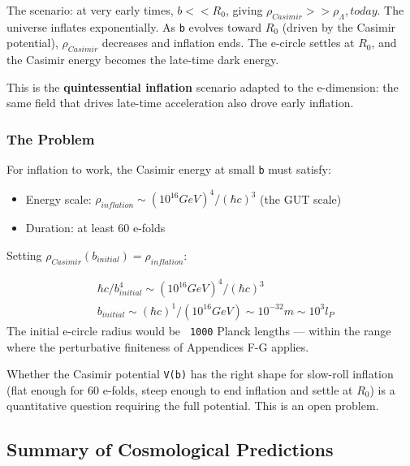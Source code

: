 \documentclass[aps,prd,preprint,superscriptaddress,longbibliography,floatfix]{revtex4-2}
\theoremstyle{remark}
\begin{document}
The scenario: at very early times, $b << R_{0}$, giving $\rho_{Casimir} >> \rho_\Lambda,today$. The universe inflates exponentially. As \texttt{b} evolves toward $R_{0}$ (driven by the Casimir potential), $\rho_{Casimir}$ decreases and inflation ends. The e-circle settles at $R_{0}$, and the Casimir energy becomes the late-time dark energy.

This is the \textbf{quintessential inflation} scenario adapted to the e-dimension: the same field that drives late-time acceleration also drove early inflation.


\subsubsection{The Problem}

For inflation to work, the Casimir energy at small \texttt{b} must satisfy:

\begin{itemize}
  \item Energy scale: $\rho_{inflation} \sim  (10^{16} GeV)^{4} / (\hbar c)^{3}$ (the GUT scale)
  \item Duration: at least 60 e-folds
\end{itemize}

Setting $\rho_{Casimir}(b_{initial}) = \rho_{inflation}$:


\begin{align}
    & \hbar c/b_{initial}^{4} \sim  (10^{16} GeV)^{4} / (\hbar c)^{3} \\
    & b_{initial} \sim  (\hbar c)^{1} / (10^{16} GeV) \sim  10^{-32} m \sim  10^{3} l_P
\end{align}
The initial e-circle radius would be \texttt{~1000} Planck lengths --- within the range where the perturbative finiteness of Appendices F-G applies.

Whether the Casimir potential \texttt{V(b)} has the right shape for slow-roll inflation (flat enough for 60 e-folds, steep enough to end inflation and settle at $R_{0}$) is a quantitative question requiring the full potential. This is an open problem.



\subsection{Summary of Cosmological Predictions}
\end{document}
